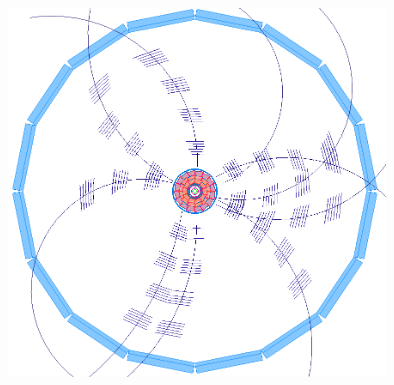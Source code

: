 \documentclass[18pt, aspectratio=169]{beamer}
\begin{document}
\begin{frame}
\begin{columns}
\begin{column}{0.5\textwidth}
      \includegraphics[width=0.75\textwidth]{figures/b2display_screenshots/y4s_nobackground_edited.png}
    \end{column}
  \end{columns}
\end{frame}
\end{document}
